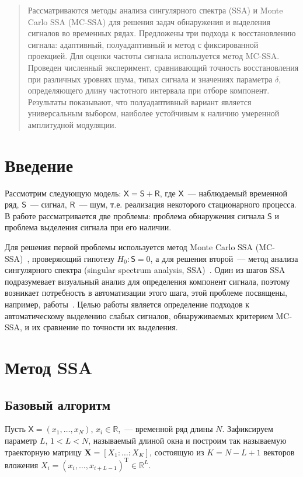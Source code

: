 \documentclass{math-mech-sci}
\begin{document}
\maketitle

\begin{abstract}
   Рассматриваются методы анализа сингулярного спектра (SSA) и Monte Carlo SSA (MC-SSA) для решения задач обнаружения и выделения сигналов во временных рядах. Предложены три подхода к восстановлению сигнала: адаптивный, полуадаптивный и метод с фиксированной проекцией. Для оценки частоты сигнала используется метод MC-SSA. Проведен численный эксперимент, сравнивающий точность восстановления при различных уровнях шума, типах сигнала и значениях параметра $\delta$, определяющего длину частотного интервала при отборе компонент. Результаты показывают, что полуадаптивный вариант является универсальным выбором, наиболее устойчивым к наличию умеренной амплитудной  модуляции.
\end{abstract}

\section*{Введение}
Рассмотрим следующую модель: $\mathsf{X}=\mathsf{S}+\mathsf{R}$, где $\mathsf{X}$~--- наблюдаемый временной ряд, $\mathsf{S}$~--- сигнал, $\mathsf{R}$~--- шум, т.е. реализация некоторого стационарного процесса. В работе рассматривается две проблемы: проблема обнаружения сигнала $\mathsf{S}$ и проблема выделения сигнала при его наличии.

Для решения первой проблемы используется метод Monte Carlo SSA (MC-SSA)~\cite{AllenSmith96}, проверяющий гипотезу $H_0:\mathsf{S}=0$, а для решения второй~--- метод анализа сингулярного спектра (singular spectrum analysis, SSA)~\cite{Broomhead1986, ssa2001}. Один из шагов SSA подразумевает визуальный анализ для определения компонент сигнала, поэтому возникает потребность в автоматизации этого шага, этой проблеме посвящены, например, работы~\cite{alexandrov, Kalantari2019, circSSA, autoSSA}. Целью работы является определение подходов к автоматическому выделению слабых сигналов, обнаруживаемых критерием MC-SSA, и их сравнение по точности их выделения.

\section*{Метод SSA}
\subsection*{Базовый алгоритм}
Пусть $\mathsf{X}=(x_1,\ldots,x_N)$, $x_i\in \mathbb{R}$,~--- временной ряд длины $N$. Зафиксируем параметр $L$, $1<L<N$, называемый длиной окна и построим так называемую траекторную матрицу $\mathbf{X}=[X_1:\ldots:X_K]$, состоящую из $K=N-L+1$ векторов вложения $X_i=(x_i,\ldots,x_{i+L-1})^{\mathrm{T}}\in \mathbb R^L$.
\end{document}
